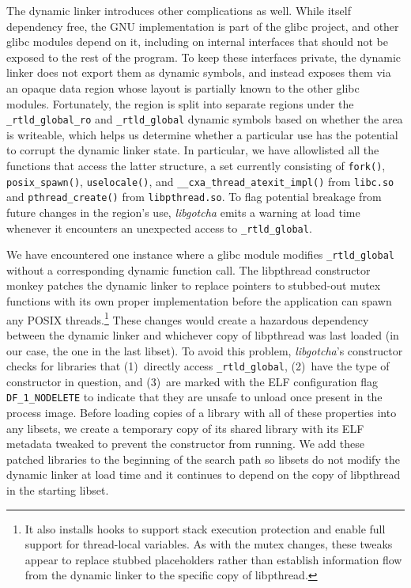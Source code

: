 The dynamic linker introduces other complications as well.  While itself dependency
free, the GNU implementation is part of the glibc project, and other glibc modules
depend on it, including on internal interfaces that should not be exposed to the rest
of the program.  To keep these interfaces private, the dynamic linker does not export
them as dynamic symbols, and instead exposes them via an opaque data region whose
layout is partially known to the other glibc modules.  Fortunately, the region is
split into separate regions under the \texttt{\_rtld\_global\_ro} and
\texttt{\_rtld\_global} dynamic symbols based on whether the area is writeable, which
helps us determine whether a particular use has the potential to corrupt the dynamic
linker state.  In particular, we have allowlisted all the functions that access the
latter structure, a set currently consisting of \texttt{fork()},
\texttt{posix\_spawn()}, \texttt{uselocale()}, and
\texttt{\_\_cxa\_thread\_atexit\_impl()} from \texttt{libc.so} and
\texttt{pthread\_create()} from \texttt{libpthread.so}.  To flag potential breakage
from future changes in the region's use, \textit{libgotcha} emits a warning at load
time whenever it encounters an unexpected access to \texttt{\_rtld\_global}.

We have encountered one instance where a glibc module modifies
\texttt{\_rtld\_global} without a corresponding dynamic function call.  The
libpthread constructor monkey patches the dynamic linker to replace pointers to
stubbed-out mutex functions with its own proper implementation before the application
can spawn any POSIX threads.\footnote{It also installs hooks to support stack
execution protection and enable full support for thread-local variables.  As with the
mutex changes, these tweaks appear to replace stubbed placeholders rather than
establish information flow from the dynamic linker to the specific copy of
libpthread.}  These changes would create a hazardous dependency between the dynamic
linker and whichever copy of libpthread was last loaded (in our case, the one in the
last libset).  To avoid this problem, \textit{libgotcha}'s constructor checks for
libraries that (1)~directly access \texttt{\_rtld\_global}, (2)~have the type of
constructor in question, and (3)~are marked with the ELF configuration flag
\texttt{DF\_1\_NODELETE} to indicate that they are unsafe to unload once present in
the process image.  Before loading copies of a library with all of these properties
into any libsets, we create a temporary copy of its shared library with its ELF
metadata tweaked to prevent the constructor from running.  We add these patched
libraries to the beginning of the search path so libsets do not modify the dynamic
linker at load time and it continues to depend on the copy of libpthread in the
starting libset.

